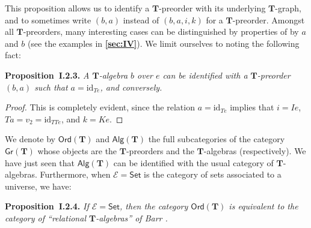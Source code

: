 \documentclass[fleqn]{article}
\newenvironment{itenv}[1]
  {\phantomsection\par\medskip\noindent\textbf{#1.}\itshape}
  {\par\medskip}
\newcommand{\oldpage}[1]{\marginpar{\footnotesize$\Big\vert$ \textit{p.~#1}}}
\newcommand{\unsure}[1]{{\color{purple}\textbf{#1}}}
\newcommand{\id}{\mathrm{id}}
\newcommand{\TT}{\mathbf{T}}
\newcommand{\cat}[1]{\mathcal{#1}}
\newcommand{\Cat}[1]{\mathsf{#1}}
\newcommand{\Gr}[1]{\Cat{Gr}(#1)}
\newcommand{\Alg}[1]{\Cat{Alg}(#1)}
\newcommand{\Ord}[1]{\Cat{Ord}(#1)}
\begin{document}
This proposition allows us to identify a $\TT$-preorder with its underlying $\TT$-graph, and to sometimes write $(b,a)$ instead of $(b,a,i,k)$ for a $\TT$-preorder.
Amongst all $\TT$-preorders, many interesting cases can be distinguished by properties of by $a$ and $b$ (see the examples in \unsure{\cref{sec:IV}}).
We limit ourselves to noting the following fact:

\begin{itenv}{Proposition~I.2.3}
  A $\TT$-algebra $b$ over $e$ can be identified with a $\TT$-preorder $(b,a)$ such that $a=\id_{Te}$, and conversely.
\end{itenv}

\begin{proof}
  This is completely evident, since the relation $a=\id_{Te}$ implies that $i=Ie$, $Ta=v_2=\id_{TTe}$, and $k=Ke$.
\end{proof}

\oldpage{231}
We denote by $\Ord{\TT}$ and $\Alg{\TT}$ the full subcategories of the category $\Gr{\TT}$ whose objects are the $\TT$-preorders and the $\TT$-algebras (respectively).
We have just seen that $\Alg{\TT}$ can be identified with the usual category of $\TT$-algebras.
Furthermore, when $\cat{E}=\Cat{Set}$ is the category of sets associated to a universe, we have:

\begin{itenv}{Proposition~I.2.4}
\label{proposition:I.2.4}
  If $\cat{E}=\Cat{Set}$, then the category $\Ord{\TT}$ is equivalent to the category of ``relational $\TT$-algebras'' of Barr {\cite{Ba}}.
\end{itenv}
\end{document}
